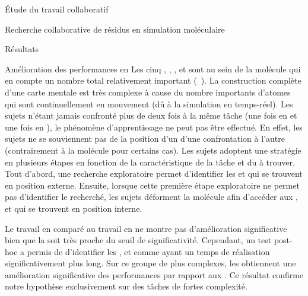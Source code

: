\documentclass[myfrancais]{mythesis}
\begin{document}
\begin{mypart}{Étude du travail collaboratif}
\begin{mychapter}{Recherche collaborative de résidus en simulation moléculaire}
\begin{mysection}{Résultats}
\begin{mysubsection}{Amélioration des performances en }
					Les cinq  , , ,  et  sont au sein de la molécule \myPrion qui en compte un nombre total relativement important (~).
					La construction complète d'une carte mentale est très complexe à cause du nombre importants d'atomes qui sont continuellement en mouvement (dû à la simulation en temps-réel).
					Les sujets n'étant jamais confronté plus de deux fois à la même tâche (une fois en  et une fois en ), le phénomène d'apprentissage ne peut pas être effectué.
					En effet, les sujets ne se souviennent pas de la position d'un  d'une confrontation à l'autre (contrairement à la molécule \myTRPCAGE pour certains cas).
					Les sujets adoptent une stratégie en plusieurs étapes en fonction de la caractéristique de la tâche et du  à trouver.
					Tout d'abord, une recherche exploratoire permet d'identifier les   et  qui se trouvent en position externe.
					Ensuite, lorsque cette première étape exploratoire ne permet pas d'identifier le  recherché, les sujets déforment la molécule afin d'accéder aux  ,  et  qui se trouvent en position interne.

					Le travail en  comparé au travail en  ne montre pas d'amélioration significative bien que la \mypvalue soit très proche du seuil de significativité.
					Cependant, un test post-hoc a permis de d'identifier les  ,  et  comme ayant un temps de réalisation significativement plus long.
					Sur ce groupe de  plus complexes, les  obtiennent une amélioration significative des performances par rapport aux .
					Ce résultat confirme notre hypothèse  exclusivement sur des tâches de fortes complexité.


\end{mysubsection}
\end{mysection}
\end{mychapter}
\end{mypart}
\end{document}
